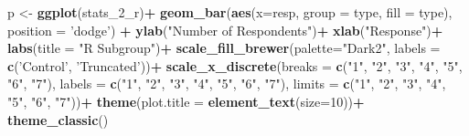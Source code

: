 \documentclass[
]{article}
\newenvironment{Shaded}{\begin{snugshade}}{\end{snugshade}}
\newcommand{\DataTypeTok}[1]{\textcolor[rgb]{0.13,0.29,0.53}{#1}}
\newcommand{\DecValTok}[1]{\textcolor[rgb]{0.00,0.00,0.81}{#1}}
\newcommand{\KeywordTok}[1]{\textcolor[rgb]{0.13,0.29,0.53}{\textbf{#1}}}
\newcommand{\NormalTok}[1]{#1}
\newcommand{\OperatorTok}[1]{\textcolor[rgb]{0.81,0.36,0.00}{\textbf{#1}}}
\newcommand{\StringTok}[1]{\textcolor[rgb]{0.31,0.60,0.02}{#1}}
\begin{document}
\begin{Shaded}
\begin{Highlighting}[]
\NormalTok{p <-}\StringTok{ }\KeywordTok{ggplot}\NormalTok{(stats_}\DecValTok{2}\NormalTok{_r)}\OperatorTok{+}
\StringTok{  }\KeywordTok{geom_bar}\NormalTok{(}\KeywordTok{aes}\NormalTok{(}\DataTypeTok{x=}\NormalTok{resp, }\DataTypeTok{group =}\NormalTok{ type, }\DataTypeTok{fill =}\NormalTok{ type), }\DataTypeTok{position =} \StringTok{'dodge'}\NormalTok{) }\OperatorTok{+}
\StringTok{  }\KeywordTok{ylab}\NormalTok{(}\StringTok{"Number of Respondents"}\NormalTok{)}\OperatorTok{+}
\StringTok{  }\KeywordTok{xlab}\NormalTok{(}\StringTok{"Response"}\NormalTok{)}\OperatorTok{+}
\StringTok{  }\KeywordTok{labs}\NormalTok{(}\DataTypeTok{title =} \StringTok{"R Subgroup"}\NormalTok{)}\OperatorTok{+}
\StringTok{  }\KeywordTok{scale_fill_brewer}\NormalTok{(}\DataTypeTok{palette=}\StringTok{"Dark2"}\NormalTok{, }\DataTypeTok{labels =} \KeywordTok{c}\NormalTok{(}\StringTok{'Control'}\NormalTok{, }\StringTok{'Truncated'}\NormalTok{))}\OperatorTok{+}
\StringTok{  }\KeywordTok{scale_x_discrete}\NormalTok{(}\DataTypeTok{breaks =} \KeywordTok{c}\NormalTok{(}\StringTok{"1"}\NormalTok{, }\StringTok{"2"}\NormalTok{, }\StringTok{"3"}\NormalTok{, }\StringTok{"4"}\NormalTok{, }\StringTok{"5"}\NormalTok{, }\StringTok{"6"}\NormalTok{, }\StringTok{"7"}\NormalTok{), }\DataTypeTok{labels =} \KeywordTok{c}\NormalTok{(}\StringTok{"1"}\NormalTok{, }\StringTok{"2"}\NormalTok{, }\StringTok{"3"}\NormalTok{, }\StringTok{"4"}\NormalTok{, }\StringTok{"5"}\NormalTok{, }\StringTok{"6"}\NormalTok{, }\StringTok{"7"}\NormalTok{), }\DataTypeTok{limits =} \KeywordTok{c}\NormalTok{(}\StringTok{"1"}\NormalTok{, }\StringTok{"2"}\NormalTok{, }\StringTok{"3"}\NormalTok{, }\StringTok{"4"}\NormalTok{, }\StringTok{"5"}\NormalTok{, }\StringTok{"6"}\NormalTok{, }\StringTok{"7"}\NormalTok{))}\OperatorTok{+}
\StringTok{  }\KeywordTok{theme}\NormalTok{(}\DataTypeTok{plot.title =} \KeywordTok{element_text}\NormalTok{(}\DataTypeTok{size=}\DecValTok{10}\NormalTok{))}\OperatorTok{+}
\StringTok{  }\KeywordTok{theme_classic}\NormalTok{()}


\end{Highlighting}
\end{Shaded}
\end{document}
